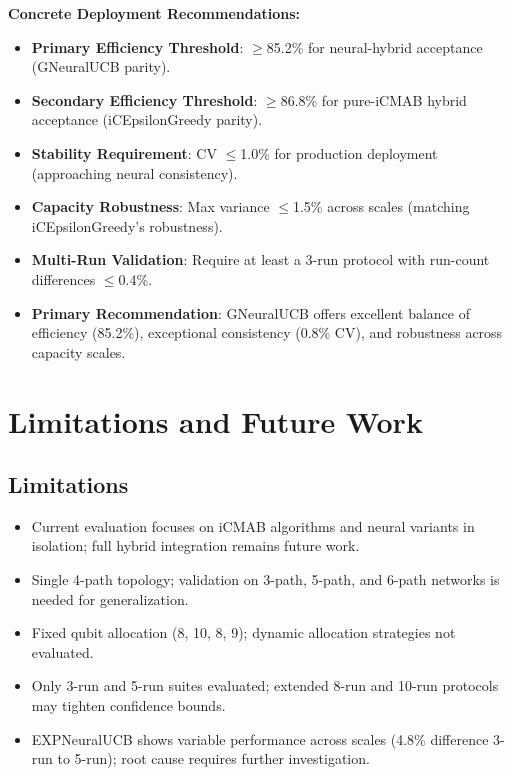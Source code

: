 \documentclass[12pt,a4paper]{article}
\begin{document}
\textbf{Concrete Deployment Recommendations:}
\begin{itemize}
\item \textbf{Primary Efficiency Threshold}: $\geq$85.2\% for neural-hybrid acceptance (GNeuralUCB parity).
\item \textbf{Secondary Efficiency Threshold}: $\geq$86.8\% for pure-iCMAB hybrid acceptance (iCEpsilonGreedy parity).
\item \textbf{Stability Requirement}: CV $\leq$1.0\% for production deployment (approaching neural consistency).
\item \textbf{Capacity Robustness}: Max variance $\leq$1.5\% across scales (matching iCEpsilonGreedy's robustness).
\item \textbf{Multi-Run Validation}: Require at least a 3-run protocol with run-count differences $\leq$0.4\%.
\item \textbf{Primary Recommendation}: GNeuralUCB offers excellent balance of efficiency (85.2\%), exceptional consistency (0.8\% CV), and robustness across capacity scales.
\end{itemize}

\section{Limitations and Future Work}

\subsection{Limitations}
\begin{itemize}
\item Current evaluation focuses on iCMAB algorithms and neural variants in isolation; full hybrid integration remains future work.
\item Single 4-path topology; validation on 3-path, 5-path, and 6-path networks is needed for generalization.
\item Fixed qubit allocation (8, 10, 8, 9); dynamic allocation strategies not evaluated.
\item Only 3-run and 5-run suites evaluated; extended 8-run and 10-run protocols may tighten confidence bounds.
\item EXPNeuralUCB shows variable performance across scales (4.8\% difference 3-run to 5-run); root cause requires further investigation.
\end{itemize}
\end{document}
